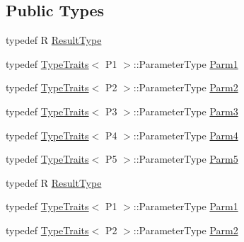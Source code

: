 \subsection*{Public Types}
\begin{DoxyCompactItemize}
\item 
typedef R \mbox{\hyperlink{classUtil_1_1FunctorImpl_3_01R_00_01TYPELIST__5_07P1_00_01P2_00_01P3_00_01P4_00_01P5_08_4_ad1b291756f0f94ecde300b4a2ea9ce14}{Result\+Type}}
\item 
typedef \mbox{\hyperlink{classUtil_1_1TypeTraits}{Type\+Traits}}$<$ P1 $>$\+::Parameter\+Type \mbox{\hyperlink{classUtil_1_1FunctorImpl_3_01R_00_01TYPELIST__5_07P1_00_01P2_00_01P3_00_01P4_00_01P5_08_4_abeccc1e3199db67f0637ce1fc9b08a32}{Parm1}}
\item 
typedef \mbox{\hyperlink{classUtil_1_1TypeTraits}{Type\+Traits}}$<$ P2 $>$\+::Parameter\+Type \mbox{\hyperlink{classUtil_1_1FunctorImpl_3_01R_00_01TYPELIST__5_07P1_00_01P2_00_01P3_00_01P4_00_01P5_08_4_a9fbaabce4a80f1e7e9eb68fd8ad2a476}{Parm2}}
\item 
typedef \mbox{\hyperlink{classUtil_1_1TypeTraits}{Type\+Traits}}$<$ P3 $>$\+::Parameter\+Type \mbox{\hyperlink{classUtil_1_1FunctorImpl_3_01R_00_01TYPELIST__5_07P1_00_01P2_00_01P3_00_01P4_00_01P5_08_4_a5ad1ce88b66a6e09b4a462f27ebeb665}{Parm3}}
\item 
typedef \mbox{\hyperlink{classUtil_1_1TypeTraits}{Type\+Traits}}$<$ P4 $>$\+::Parameter\+Type \mbox{\hyperlink{classUtil_1_1FunctorImpl_3_01R_00_01TYPELIST__5_07P1_00_01P2_00_01P3_00_01P4_00_01P5_08_4_a9fb458de88c9f2050fd168a315f93033}{Parm4}}
\item 
typedef \mbox{\hyperlink{classUtil_1_1TypeTraits}{Type\+Traits}}$<$ P5 $>$\+::Parameter\+Type \mbox{\hyperlink{classUtil_1_1FunctorImpl_3_01R_00_01TYPELIST__5_07P1_00_01P2_00_01P3_00_01P4_00_01P5_08_4_a465c4b811dcbcfecb64048b28429c6ab}{Parm5}}
\item 
typedef R \mbox{\hyperlink{classUtil_1_1FunctorImpl_3_01R_00_01TYPELIST__5_07P1_00_01P2_00_01P3_00_01P4_00_01P5_08_4_ad1b291756f0f94ecde300b4a2ea9ce14}{Result\+Type}}
\item 
typedef \mbox{\hyperlink{classUtil_1_1TypeTraits}{Type\+Traits}}$<$ P1 $>$\+::Parameter\+Type \mbox{\hyperlink{classUtil_1_1FunctorImpl_3_01R_00_01TYPELIST__5_07P1_00_01P2_00_01P3_00_01P4_00_01P5_08_4_abeccc1e3199db67f0637ce1fc9b08a32}{Parm1}}
\item 
typedef \mbox{\hyperlink{classUtil_1_1TypeTraits}{Type\+Traits}}$<$ P2 $>$\+::Parameter\+Type \mbox{\hyperlink{classUtil_1_1FunctorImpl_3_01R_00_01TYPELIST__5_07P1_00_01P2_00_01P3_00_01P4_00_01P5_08_4_a9fbaabce4a80f1e7e9eb68fd8ad2a476}{Parm2}}

\end{DoxyCompactItemize}
